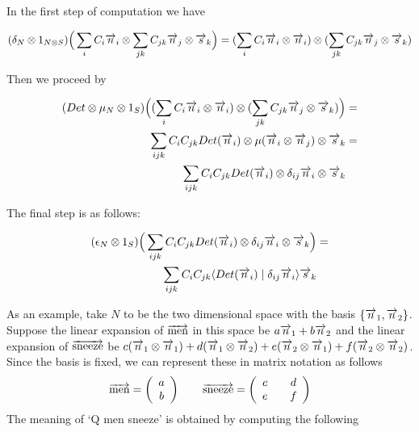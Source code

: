 In the first step of computation we have

\begin{align*}
(\delta_N \otimes 1_{N \otimes S})\Big(\sum_i C_i \overrightarrow{n}_i \otimes \sum_{jk} C_{jk} \overrightarrow{n}_j \otimes \overrightarrow{s}_k\Big) = 
(\sum_i C_i \overrightarrow{n}_i \otimes \overrightarrow{n}_i) \otimes  (\sum_{jk} C_{jk} \overrightarrow{n}_j \otimes \overrightarrow{s}_k)
\end{align*}

\noindent
Then we proceed by

\begin{align*}
(Det \otimes  \mu_N \otimes 1_S)\Big((\sum_i C_i \overrightarrow{n}_i \otimes \overrightarrow{n}_i) \otimes  (\sum_{jk} C_{jk} \overrightarrow{n}_j \otimes \overrightarrow{s}_k)\Big) &= \\
\sum_{ijk} C_i C_{jk} Det(\overrightarrow{n}_i) \otimes \mu(\overrightarrow{n}_i \otimes \overrightarrow{n}_j) \otimes \overrightarrow{s}_k &=\\
\sum_{ijk} C_i C_{jk} Det(\overrightarrow{n}_i) \otimes \delta_{ij} \overrightarrow{n}_i \otimes \overrightarrow{s}_k&
\end{align*}

\noindent
The final step is as follows:

\begin{align*}
(\epsilon_{N} \otimes 1_S)  \Big(\sum_{ijk} C_i C_{jk} Det(\overrightarrow{n}_i) \otimes \delta_{ij} \overrightarrow{n}_i \otimes \overrightarrow{s}_k \Big) &=   \\
\sum_{ijk} C_i C_{jk} \langle Det(\overrightarrow{n}_i) \mid \delta_{ij} \overrightarrow{n}_i \rangle \overrightarrow{s}_k
\end{align*}


As an example, take $N$ to be the two dimensional space with the basis $\{\overrightarrow{n}_1, \overrightarrow{n}_2\}$. Suppose the linear expansion of $\overrightarrow{\text{men}}$ in this space be $a \overrightarrow{n}_1 + b \overrightarrow{n}_2$ and the linear expansion of $\overrightarrow{\text{sneeze}}$ be $c (\overrightarrow{n}_1 \otimes \overrightarrow{n}_1) + d (\overrightarrow{n}_1 \otimes \overrightarrow{n}_2) + e( \overrightarrow{n}_2 \otimes \overrightarrow{n}_1) + f (\overrightarrow{n}_2 \otimes \overrightarrow{n}_2)$.  Since the  basis is fixed, we can represent these in matrix notation as follows
\[
\overrightarrow{\text{men}} = \left ( \begin{array}{c} a\\b\end{array}\right)\qquad
\overrightarrow{\text{sneeze}} = \left (\begin{array}{cc} c \quad & d\\ e \quad &f \end{array}\right)
\]
The meaning of `Q men sneeze' is obtained by computing the following

